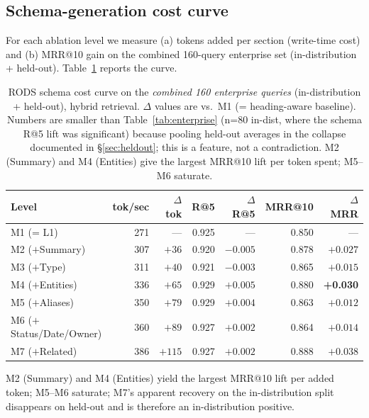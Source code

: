 \documentclass[11pt]{article}
\begin{document}
\subsection{Schema-generation cost curve}
\label{sec:cost}

For each ablation level we measure (a) tokens added per section
(write-time cost) and (b) MRR@10 gain on the combined 160-query
enterprise set (in-distribution + held-out). Table~\ref{tab:cost}
reports the curve.

\begin{table}[t]
\centering
\caption{RODS schema cost curve on the \emph{combined 160 enterprise
  queries} (in-distribution + held-out), hybrid retrieval. $\Delta$
  values are vs.\ M1 (= heading-aware baseline). Numbers are smaller
  than Table~\ref{tab:enterprise} (n=80 in-dist, where the schema
  R@5 lift was significant) because pooling held-out averages in the
  collapse documented in \S\ref{sec:heldout}; this is a feature, not a
  contradiction. M2 (Summary) and M4 (Entities) give the largest
  MRR@10 lift per token spent; M5--M6 saturate.}
\label{tab:cost}
\small
\begin{tabular}{lrrrrrr}
\toprule
\textbf{Level} & \textbf{tok/sec} & $\Delta$\textbf{tok}
               & \textbf{R@5} & $\Delta$\textbf{R@5}
               & \textbf{MRR@10} & $\Delta$\textbf{MRR} \\
\midrule
M1 (= L1)        & 271 & ---  & 0.925 & ---     & 0.850 & --- \\
M2 ($+$Summary)  & 307 & $+36$ & 0.920 & $-0.005$ & 0.878 & $+0.027$ \\
M3 ($+$Type)     & 311 & $+40$ & 0.921 & $-0.003$ & 0.865 & $+0.015$ \\
\rowcolor{bestcolor!12}
M4 ($+$Entities) & 336 & $+65$ & 0.929 & $+0.005$ & 0.880 & \textbf{+0.030} \\
M5 ($+$Aliases)  & 350 & $+79$ & 0.929 & $+0.004$ & 0.863 & $+0.012$ \\
M6 ($+$Status/Date/Owner) & 360 & $+89$ & 0.927 & $+0.002$ & 0.864 & $+0.014$ \\
M7 ($+$Related)  & 386 & $+115$ & 0.927 & $+0.002$ & 0.888 & $+0.038$ \\
\bottomrule
\end{tabular}
\end{table}

M2 (Summary) and M4 (Entities) yield the largest MRR@10 lift per
added token; M5--M6 saturate; M7's apparent recovery on the
in-distribution split disappears on held-out and is therefore an
in-distribution positive.
\end{document}
